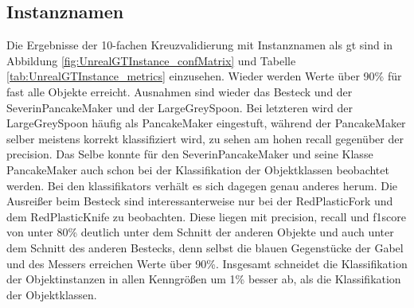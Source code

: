 

\subsection{Instanznamen}

Die Ergebnisse der 10-fachen Kreuzvalidierung mit Instanznamen als \gls{gt} sind in Abbildung \ref{fig:UnrealGTInstance_confMatrix} und Tabelle \ref{tab:UnrealGTInstance_metrics} einzusehen. Wieder werden Werte über 90\% für fast alle Objekte erreicht. Ausnahmen sind wieder das Besteck und der SeverinPancakeMaker und der LargeGreySpoon. Bei letzteren wird der LargeGreySpoon häufig als PancakeMaker eingestuft, während der PancakeMaker selber meistens korrekt klassifiziert wird, zu sehen am hohen \gls{recall} gegenüber der \gls{precision}. Das Selbe konnte für den SeverinPancakeMaker und seine Klasse PancakeMaker auch schon bei der Klassifikation der Objektklassen beobachtet werden. Bei den \glspl{klassifikator} verhält es sich dagegen genau anderes herum. Die Ausreißer beim Besteck sind interessanterweise nur bei der RedPlasticFork und dem RedPlasticKnife zu beobachten. Diese liegen mit \gls{precision}, \gls{recall} und \gls{f1score} von unter 80\% deutlich unter dem Schnitt der anderen Objekte und auch unter dem Schnitt des anderen Bestecks, denn selbst die blauen Gegenstücke der Gabel und des Messers erreichen Werte über 90\%. Insgesamt schneidet die Klassifikation der Objektinstanzen in allen Kenngrößen um 1\% besser ab, als die Klassifikation der Objektklassen.

